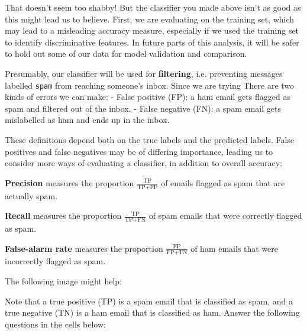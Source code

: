 \documentclass[11pt]{article}
\begin{document}
That doesn't seem too shabby! But the classifier you made above isn't as
good as this might lead us to believe. First, we are evaluating on the
training set, which may lead to a misleading accuracy measure,
especially if we used the training set to identify discriminative
features. In future parts of this analysis, it will be safer to hold out
some of our data for model validation and comparison.

Presumably, our classifier will be used for \textbf{filtering}, i.e.
preventing messages labelled \texttt{spam} from reaching someone's
inbox. Since we are trying There are two kinds of errors we can make: -
False positive (FP): a ham email gets flagged as spam and filtered out
of the inbox. - False negative (FN): a spam email gets mislabelled as
ham and ends up in the inbox.

These definitions depend both on the true labels and the predicted
labels. False positives and false negatives may be of differing
importance, leading us to consider more ways of evaluating a classifier,
in addition to overall accuracy:

\textbf{Precision} measures the proportion
\(\frac{\text{TP}}{\text{TP} + \text{FP}}\) of emails flagged as spam
that are actually spam.

\textbf{Recall} measures the proportion
\(\frac{\text{TP}}{\text{TP} + \text{FN}}\) of spam emails that were
correctly flagged as spam.

\textbf{False-alarm rate} measures the proportion
\(\frac{\text{FP}}{\text{FP} + \text{TN}}\) of ham emails that were
incorrectly flagged as spam.

The following image might help:

Note that a true positive (TP) is a spam email that is classified as
spam, and a true negative (TN) is a ham email that is classified as ham.
Answer the following questions in the cells below:
\end{document}
